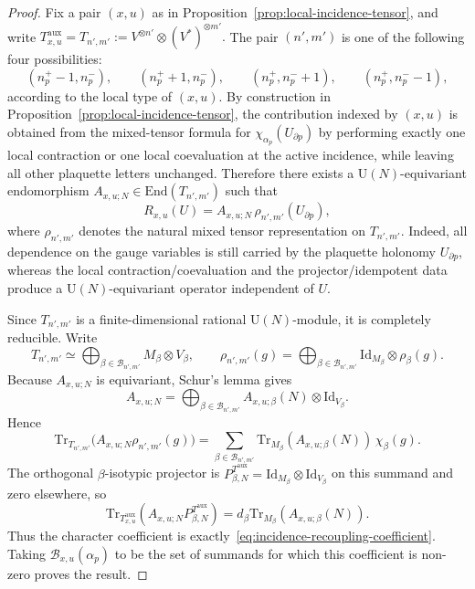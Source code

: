 \documentclass[11pt,a4paper,reqno]{article}
\theoremstyle{definition}
\theoremstyle{remark}
\newcommand\U{{\mathrm U}}
\newcommand\Id{\mathrm{Id}}
\newcommand\Tr{\mathrm{Tr}}
\newcommand\End{{\mathrm{End}}}
\newcommand\B{{\mathcal{B}}}
\begin{document}
\begin{proof}
Fix a pair \((x,u)\) as in Proposition~\ref{prop:local-incidence-tensor}, and write $T^{\mathrm{aux}}_{x,u}=T_{n',m'}:=V^{\otimes n'}\otimes (V^*)^{\otimes m'}.$ The pair \((n',m')\) is one of the following four possibilities:
\[
(n_p^+-1,n_p^-),\qquad (n_p^++1,n_p^-),\qquad
(n_p^+,n_p^-+1),\qquad (n_p^+,n_p^--1),
\]
according to the local type of \((x,u)\). By construction in Proposition~\ref{prop:local-incidence-tensor}, the contribution indexed by \((x,u)\) is obtained from the mixed-tensor formula for \(\chi_{\alpha_p}(U_{\partial p})\) by performing exactly one local contraction or one local coevaluation at the active incidence, while leaving all other plaquette letters unchanged. Therefore there exists a \(\U(N)\)-equivariant endomorphism $A_{x,u;N}\in \End(T_{n',m'})$ such that
\[
R_{x,u}(U)=A_{x,u;N}\,\rho_{n',m'}(U_{\partial p}),
\]
where \(\rho_{n',m'}\) denotes the natural mixed tensor representation on \(T_{n',m'}\). Indeed, all dependence on the gauge variables is still carried by the plaquette holonomy \(U_{\partial p}\), whereas the local contraction/coevaluation and the projector/idempotent data produce a \(\U(N)\)-equivariant operator independent of \(U\).

Since $T_{n',m'}$ is a finite-dimensional rational $\U(N)$-module, it is completely reducible. Write
\[
T_{n',m'}\simeq \bigoplus_{\beta\in\B_{n',m'}}M_\beta\otimes V_\beta,
\qquad
\rho_{n',m'}(g)=\bigoplus_{\beta\in\B_{n',m'}}\Id_{M_\beta}\otimes\rho_\beta(g).
\]
Because $A_{x,u;N}$ is equivariant, Schur's lemma gives
\[
A_{x,u;N}=\bigoplus_{\beta\in\B_{n',m'}}A_{x,u;\beta}(N)\otimes\Id_{V_\beta}.
\]
Hence
\[
\Tr_{T_{n',m'}}\!\bigl(A_{x,u;N}\rho_{n',m'}(g)\bigr)
=\sum_{\beta\in\B_{n',m'}}\Tr_{M_\beta}(A_{x,u;\beta}(N))\,\chi_\beta(g).
\]
The orthogonal $\beta$-isotypic projector is $P^{T^{\mathrm{aux}}}_{\beta,N}=\Id_{M_\beta}\otimes\Id_{V_\beta}$ on this summand and zero elsewhere, so
\[
\Tr_{T^{\mathrm{aux}}_{x,u}}\!\left(A_{x,u;N}P^{T^{\mathrm{aux}}}_{\beta,N}\right)
=d_\beta\Tr_{M_\beta}(A_{x,u;\beta}(N)).
\]
Thus the character coefficient is exactly~\eqref{eq:incidence-recoupling-coefficient}. Taking $\B_{x,u}(\alpha_p)$ to be the set of summands for which this coefficient is non-zero proves the result.
\end{proof}

\medskip
\end{document}
